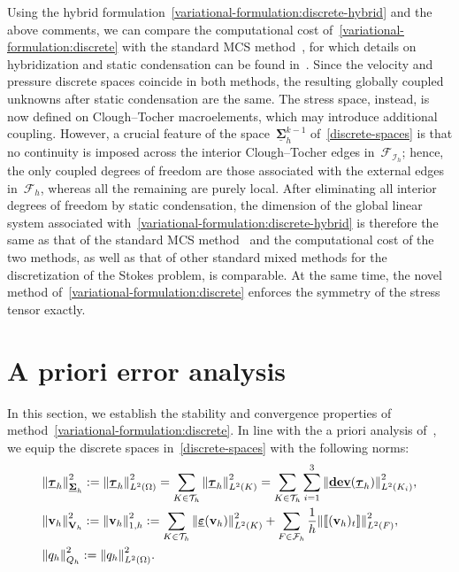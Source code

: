 \documentclass[a4paper,twoside,10pt]{article}
\theoremstyle{plain}
\theoremstyle{remark}
\theoremstyle{definition}
\numberwithin{equation}{section}
\numberwithin{figure}{section}
\newcommand{\Norm}[1]{{\left\|{#1} \right\|}}
\newcommand{\jump}[1]{\left[\!\left[#1\right]\!\right]}
\newcommand{\Tauh}{\mathcal{T}_h}
\newcommand{\K}{K}
\newcommand{\F}{F}
\newcommand{\Sigmah}{\underline{\boldsymbol{\Sigma}}_h}
\newcommand{\Sigmahkmo}{\Sigmah^{k-1}}
\newcommand{\Vh}{{\bf{V}}_h}
\newcommand{\Qh}{Q_h}
\newcommand{\taubfh}{\underline{\boldsymbol{\tau}}_h}
\newcommand{\vbfh}{\mathbf{v}_h}
\newcommand{\qh}{q_h}
\DeclareMathOperator{\dev}{\underline{\mathbf{dev}}}
\newcommand{\tangscalar}{t}
\newcommand{\Ltwo}{L^2}
\newcommand{\LtwoOmega}{\Ltwo(\Omega)}
\newcommand{\Fcalhd}{\mathcal{F}_{\mathcal{I}_h}}
\newcommand{\Fcalh}{\mathcal{F}_h}
\newcommand{\epsbfun}{\underline{\boldsymbol{\varepsilon}}}
\newcommand{\Ki}{{\K_i}}
\newcommand{\NormLtwoK}[1]{\Norm{#1}_{\Ltwo(\K)}}
\begin{document}
Using the hybrid formulation~\eqref{variational-formulation:discrete-hybrid}
and the above comments,
we can compare the computational cost of~\eqref{variational-formulation:discrete}
with the standard MCS method~\cite{Gopalakrishnan-Lederer-Schoberl:2020},
for which details on hybridization and
static condensation can be found in~\cite[Sect.~4.2]{Kogler-Lederer-Schoberl:2023}.
Since the velocity and pressure discrete spaces coincide in both methods,
the resulting globally coupled unknowns after static condensation are the same.
The stress space,
instead,
is now defined on Clough--Tocher macroelements,
which may introduce additional coupling.
However,
a crucial feature of the space~$\Sigmahkmo$ of~\eqref{discrete-spaces}
is that no continuity is imposed
across the interior Clough--Tocher edges in~$\Fcalhd$;
hence,
the only coupled degrees of freedom
are those associated with the external edges in~$\Fcalh$,
whereas all the remaining are purely local.
After eliminating all interior degrees of freedom by static condensation,
the dimension of the global linear system associated with~\eqref{variational-formulation:discrete-hybrid}
is therefore the same as that of the standard MCS method~\cite{Gopalakrishnan-Lederer-Schoberl:2020}
and
the computational cost of the two methods,
as well as that of other standard mixed methods
for the discretization of the Stokes problem,
is comparable.
At the same time,
the novel method of~\eqref{variational-formulation:discrete} enforces the symmetry of the stress tensor exactly.


\section{A priori error analysis} \label{section:a-priori}
In this section,
we establish the stability and convergence properties
of method~\eqref{variational-formulation:discrete}.
In line with the a priori analysis of~\cite{Gopalakrishnan-Lederer-Schoberl:2020,Gopalakrishnan-Lederer-Schoberl:2020-b},
we equip the discrete spaces in~\eqref{discrete-spaces}
with the following norms:
\begin{align*}
&\Norm{\taubfh}_{\Sigmah}^2
    := \Norm{\taubfh}_{\LtwoOmega}^2
    =\sum_{\K \in \Tauh} \NormLtwoK{\taubfh}^2
    = \sum_{\K \in \Tauh} \sum_{i=1}^3 \Norm{\dev(\taubfh)}^2_{\Ltwo(\Ki)},  \\
&\Norm{\vbfh}_{\Vh}^{2}
    := \Norm{\vbfh}_{1,h}^{2}
    := \sum_{\K \in \Tauh} \Norm{\epsbfun(\vbfh)}_{\Ltwo(\K)}^2 + \sum_{\F \in \Fcalh}\frac{1}{h}\Norm{\jump{(\vbfh)_{\tangscalar}}}_{\Ltwo(\F)}^2, \\
&\Norm{\qh}_{\Qh}^2 := \Norm{\qh}_{\LtwoOmega}^2.
\end{align*}
\end{document}
